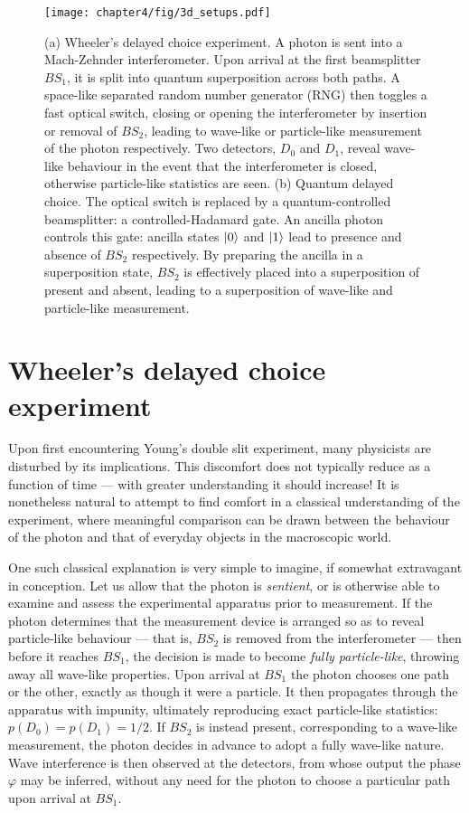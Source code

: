 \begin{figure}[t]
\centering
\texttt{[image: chapter4/fig/3d\_setups.pdf]}
\caption[Wheeler's (quantum) delayed choice experiment]{
(a) Wheeler's delayed choice experiment. A photon is sent into a Mach-Zehnder interferometer. Upon arrival at the first beamsplitter $BS_1$, it is split into quantum superposition across both paths. A space-like separated random number generator (RNG) then toggles a fast optical switch, closing or opening the interferometer by insertion or removal of $BS_2$, leading to wave-like or particle-like measurement of the photon respectively. Two detectors, $D_0$ and $D_1$, reveal wave-like behaviour in the event that the interferometer is closed, otherwise particle-like statistics are seen.
(b) Quantum delayed choice. The optical switch is replaced by a quantum-controlled beamsplitter: a controlled-Hadamard gate. An ancilla photon controls this gate: ancilla states $\mbox{$ | 0 \rangle $}$ and $\mbox{$ | 1 \rangle $}$ lead to presence and absence of $BS_2$ respectively. By preparing the ancilla in a superposition state, $BS_2$ is effectively placed into a superposition of present and absent, leading to a superposition of wave-like and particle-like measurement.
}
\label{fig:delayed-choice-setups}
\end{figure}

\section{Wheeler's delayed choice experiment}
Upon first encountering Young's double slit experiment, many physicists are disturbed by its implications. This discomfort does not typically reduce as a function of time --- with greater understanding it should increase! It is nonetheless natural to attempt to find comfort in a classical understanding of the experiment, where meaningful comparison can be drawn between the behaviour of the photon and that of everyday objects in the macroscopic world.

One such classical explanation is very simple to imagine, if somewhat extravagant in conception. Let us allow that the photon is \emph{sentient}, or is otherwise able to examine and assess the experimental apparatus prior to measurement. 
If the photon determines that the measurement device is arranged so as to reveal particle-like behaviour --- that is, $BS_2$ is removed from the interferometer --- then before it reaches $BS_1$, the decision is made to become \emph{fully particle-like}, throwing away all wave-like properties. Upon arrival at $BS_1$ the photon chooses one path or the other, exactly as though it were a particle.  It then propagates through the apparatus with impunity, ultimately reproducing exact particle-like statistics: $p(D_0)=p(D_1)=1/2$. If $BS_2$ is instead present, corresponding to a wave-like measurement, the photon decides in advance to adopt a fully wave-like nature. Wave interference is then observed at the detectors, from whose output the phase $\varphi$ may be inferred, without any need for the photon to choose a particular path upon arrival at $BS_1$. 

